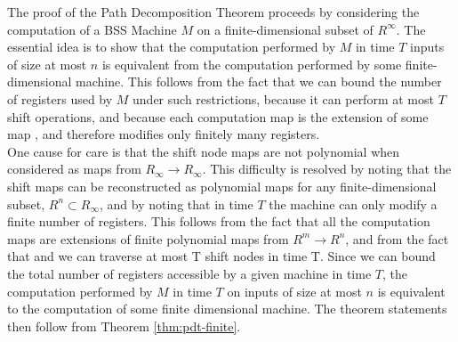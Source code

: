   \begin{proofsketch}
    
    The proof of the Path Decomposition Theorem proceeds by
    considering the computation of a BSS Machine $M$ on a
    finite-dimensional subset of $R^\infty$.  The essential idea is to
    show that the computation performed by $M$ in time $T$ inputs of
    size at most $n$ is equivalent from the computation performed by
    some finite-dimensional machine.  This follows from the fact that
    we can bound the number of registers used by $M$ under such
    restrictions, because it can perform at most $T$ shift operations,
    and because each computation map is the extension of some map
    , and therefore modifies only finitely many
    registers.\\
    
    One cause for care is that the shift node maps are not polynomial
    when considered as maps from $R_\infty \rightarrow R_\infty$.
    This difficulty is resolved by noting that the shift maps can be
    reconstructed as polynomial maps for any finite-dimensional
    subset, $R^n \subset R_\infty$, and by noting that in time $T$ the
    machine can only modify a finite number of registers.  This
    follows from the fact that all the computation maps are extensions
    of finite polynomial maps from $R^m \rightarrow R^n$, and from the
    fact that and we can traverse at most T shift nodes in time T.
    Since we can bound the total number of registers accessible by a
    given machine in time $T$, the computation performed by $M$ in
    time $T$ on inputs of size at most $n$ is equivalent to the
    computation of some finite dimensional machine.  The theorem
    statements then follow from Theorem \ref{thm:pdt-finite}.
    
  \end{proofsketch}



